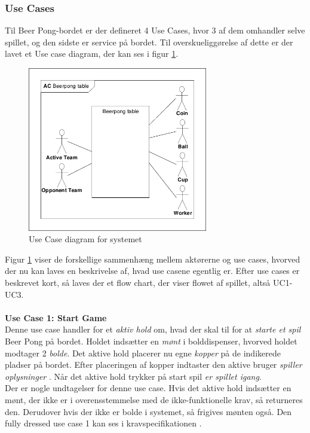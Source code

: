 \documentclass[Rapport/Rapport_main.tex]{subfiles}
\begin{document}
\subsubsection{Use Cases} \label{sec:rap_use_cases}
Til Beer Pong-bordet er der defineret 4 Use Cases, hvor 3 af dem omhandler selve spillet, og den sidste er service på bordet. Til overskueliggørelse af dette er der lavet et Use case diagram, der kan ses i figur \ref{fig:rap_uc_diagram}.
\begin{figure}[H]
    \centering
    \includegraphics[width=0.7\textwidth,trim={0.24in 0.24in 0.24in 0.24in},clip, page=2]{Kravspecifikation/Funktionelle_krav/graphics_funktionel/Krav-spec-diagrammer.pdf}
    \caption{Use Case diagram for systemet}
    \label{fig:rap_uc_diagram}
\end{figure}
Figur \ref{fig:rap_uc_diagram} viser de forskellige sammenhæng mellem aktørerne og use cases, hvorved der nu kan laves en beskrivelse af, hvad use casene egentlig er. Efter use cases er beskrevet kort, så laves der et flow chart, der viser flowet af spillet, altså UC1-UC3. \\\\
\textbf{Use Case 1: Start Game}\\
Denne use case handler for et \textit{aktiv hold} om, hvad der skal til for at \textit{starte et spil} Beer Pong på bordet. Holdet indsætter en \textit{mønt} i bolddispenser, hvorved holdet modtager 2 \textit{bolde}. Det aktive hold placerer nu egne \textit{kopper} på de indikerede pladser på bordet. Efter placeringen af kopper indtaster den aktive bruger \textit{spiller oplysninger} . Når det aktive hold trykker på start spil \textit{er spillet igang}.\\
Der er nogle undtagelser for denne use case. Hvis det aktive hold indsætter en mønt, der ikke er i overensstemmelse med de ikke-funktionelle krav, så returneres den. Derudover hvis der ikke er bolde i systemet, så frigives mønten også. Den fully dressed use case 1 kan ses i kravspecifikationen .\\\\
\end{document}
